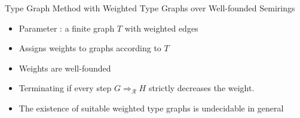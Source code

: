 \documentclass{beamer}
\newcommand{\graphbox}[8]{
  \begin{scope}[xshift=#2,yshift=#3]
    \draw [rounded corners=2mm] (0,0) rectangle (#4,-#5);
    \node at (0,0mm) [anchor=north west,inner sep=1mm] {#1};
    \begin{scope}[xshift=#4/2+#6,yshift=#7] 
    #8
    \end{scope}
  \end{scope}
}
\begin{document}

\begin{frame}{Type Graph Method with Weighted Type Graphs over Well-founded Semirings}

    \begin{itemize}
      \item Parameter : a finite graph \( T \) with weighted edges
      \item Assigns weights to graphs according to \( T \)
      \item Weights are \alert{well-founded}
      \item \alert{Terminating} if every step $G \Rightarrow_\mathcal{R} H$ strictly decreases the weight.
      \item The \alert{existence} of suitable weighted type graphs is \alert{undecidable} in general
    \end{itemize}

    
     



\end{frame}
\end{document}
